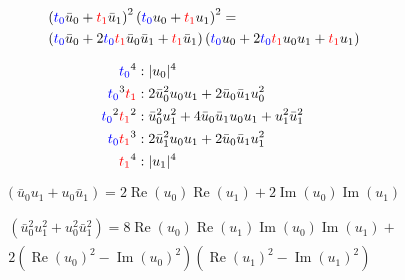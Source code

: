 \documentclass[12pt,a4paper]{article}
\newcommand{\RE}{\ensuremath{\operatorname{Re}}}
\newcommand{\IM}{\ensuremath{\operatorname{Im}}}
\newcommand{\fz}{\ensuremath{{\color{blue}t_0}}}
\newcommand{\fo}{\ensuremath{{\color{red}t_1}}}
\begin{document}
\begin{align}
&\left( \fz \bar{u}_0 + \fo \bar{u}_1 \right)^2 \left( \fz u_0 + \fo u_1 \right)^2 = \\
&\left( \fz \bar{u}_0 + 2 \fz \fo \bar{u}_0 \bar{u}_1 + \fo \bar{u}_1 \right) \left( \fz u_0 + 2 \fz \fo u_0 u_1 + \fo u_1 \right)
\end{align}

\begin{align}
\fz^4 &: \vert u_0 \vert^4 \\
\fz^3 \fo &: 2 \bar{u}_0^2 u_0 u_1 + 2 \bar{u}_0 \bar{u}_1 u_0^2 \\
\fz^2 \fo^2 &: \bar{u}_0^2 u_1^2 + 4 \bar{u}_0 \bar{u}_1 u_0 u_1 + u_1^2 \bar{u}_1^2 \\
\fz \fo^3  &: 2 \bar{u}_1^2 u_0 u_1 + 2 \bar{u}_0 \bar{u}_1 u_1^2 \\
\fo^4 &: \vert u_1 \vert^4
\end{align}

\begin{equation}
( \bar{u}_0 u_1 + u_0 \bar{u}_1 ) = 2 \RE(u_0) \RE(u_1) + 2 \IM(u_0) \IM(u_1)
\end{equation}

\begin{multline}
( \bar{u}_0^2 u_1^2 + u_0^2 \bar{u}_1^2 ) = 8 \RE(u_0) \RE(u_1) \IM(u_0) \IM(u_1) + \\ 2 (\RE(u_0)^2 - \IM(u_0)^2) (\RE(u_1)^2 - \IM(u_1)^2)
\end{multline}
\end{document}
